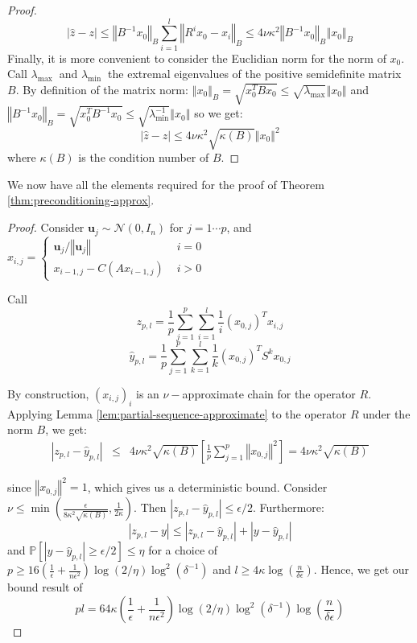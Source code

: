\begin{proof}
\[\left|\hat{z}-z\right|\leq\left\Vert B^{-1}x_{0}\right\Vert _{B}\sum_{i=1}^{l}\left\Vert R^{i}x_{0}-x_{i}\right\Vert _{B}\leq4\nu\kappa^{2}\left\Vert B^{-1}x_{0}\right\Vert _{B}\left\Vert x_{0}\right\Vert _{B}
\]
Finally, it is more convenient to consider the Euclidian norm for
the norm of $x_{0}$. Call $\lambda_{\text{max }}$ and $\lambda_{\text{min }}$
the extremal eigenvalues of the positive semidefinite matrix $B$.
By definition of the matrix norm: $\left\Vert x_{0}\right\Vert _{B}=\sqrt{x_{0}^{T}Bx_{0}}\leq\sqrt{\lambda_{\text{max}}}\left\Vert x_{0}\right\Vert $
and $\left\Vert B^{-1}x_{0}\right\Vert _{B}=\sqrt{x_{0}^{T}B^{-1}x_{0}}\leq\sqrt{\lambda_{\text{min}}^{-1}}\left\Vert x_{0}\right\Vert $
so we get: 
\[
\left|\hat{z}-z\right|\leq4\nu\kappa^{2}\sqrt{\kappa\left(B\right)}\left\Vert x_{0}\right\Vert ^{2}
\]
where $\kappa\left(B\right)$ is the condition number of $B$. 
\end{proof}
We now have all the elements required for the proof of Theorem \ref{thm:preconditioning-approx}. 
\begin{proof}
Consider $\mathbf{u}_{j}\sim\mathcal{N}\left(0,I_{n}\right)$ for
$j=1\cdots p$, and $x_{i,j}=\begin{cases}
\mathbf{u}_{j}/\left\Vert \mathbf{u}_{j}\right\Vert  & \,\, i=0\\
x_{i-1,j}-C\left(Ax_{i-1,j}\right) & \,\, i>0
\end{cases}$

Call 
\[
z_{p,l}=\frac{1}{p}\sum_{j=1}^{p}\sum_{i=1}^{l}\frac{1}{i}\left(x_{0,j}\right)^{T}x_{i,j}
\]
\[
\hat{y}_{p,l}=\frac{1}{p}\sum_{j=1}^{p}\sum_{k=1}^{l}\frac{1}{k}\left(x_{0,j}\right)^{T}S^{k}x_{0,j}
\]


By construction, $\left(x_{i,j}\right)_{i}$ is an $\nu-$approximate
chain for the operator $R$. Applying Lemma \ref{lem:partial-sequence-approximate}
to the operator $R$ under the norm $B$, we get: 
\begin{eqnarray*}
\left|z_{p,l}-\hat{y}_{p,l}\right| & \leq & 4\nu\kappa^{2}\sqrt{\kappa\left(B\right)}\left[\frac{1}{p}\sum_{j=1}^{p}\left\Vert x_{0,j}\right\Vert ^{2}\right]=4\nu\kappa^{2}\sqrt{\kappa\left(B\right)}
\end{eqnarray*}


since $\left\Vert x_{0,j}\right\Vert ^{2}=1$, which gives us a deterministic
bound. Consider $\nu\leq\min\left(\frac{\epsilon}{8\kappa^{2}\sqrt{\kappa\left(B\right)}},\frac{1}{2\kappa}\right)$.
Then $\left|z_{p,l}-\hat{y}_{p,l}\right|\leq\epsilon/2$. Furthermore:
\[
\left|z_{p,l}-y\right|\leq\left|z_{p,l}-\hat{y}_{p,l}\right|+\left|y-\hat{y}_{p,l}\right|
\]
and $\mathbb{P}\left[\left|y-\hat{y}_{p,l}\right|\geq\epsilon/2\right]\leq\eta$
for a choice of $p\geq16\left(\frac{1}{\epsilon}+\frac{1}{n\epsilon^{2}}\right)\log\left(2/\eta\right)\log^{2}\left(\delta^{-1}\right)$
and $l\geq4\kappa\log\left(\frac{n}{\delta\epsilon}\right)$. Hence,
we get our bound result of 
\[
pl=64\kappa\left(\frac{1}{\epsilon}+\frac{1}{n\epsilon^{2}}\right)\log\left(2/\eta\right)\log^{2}\left(\delta^{-1}\right)\log\left(\frac{n}{\delta\epsilon}\right)
\]
\end{proof}

